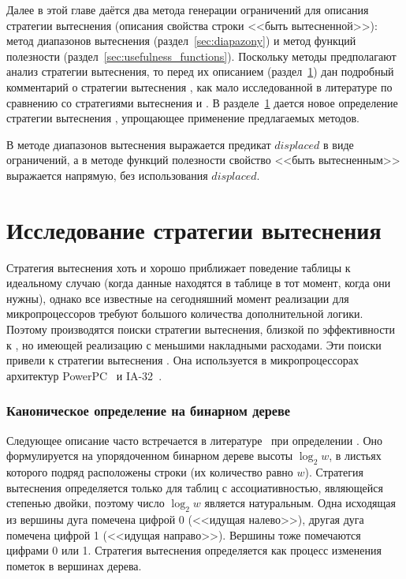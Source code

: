 Далее в этой главе даётся два метода генерации ограничений для описания
стратегии вытеснения (описания свойства строки <<быть вытесненной>>): метод диапазонов вытеснения (раздел~\ref{sec:diapazony}) и метод функций полезности (раздел~\ref{sec:usefulness_functions}). Поскольку методы предполагают анализ стратегии вытеснения, то
перед их описанием (раздел~\ref{sec:plru_new_definition}) дан подробный
комментарий о стратегии вытеснения \PseudoLRU, как мало исследованной в
литературе по сравнению со стратегиями вытеснения \LRU и \FIFO. В
разделе~\ref{sec:plru_new_definition} дается новое определение стратегии вытеснения \PseudoLRU, упрощающее применение предлагаемых методов.

В методе диапазонов вытеснения выражается предикат $displaced$ в виде ограничений, а в методе функций полезности свойство <<быть вытесненным>> выражается напрямую, без использования $displaced$.

\section{Исследование стратегии вытеснения \PseudoLRU}\label{sec:plru_new_definition}

Стратегия вытеснения \LRU хоть и хорошо приближает поведение
таблицы к идеальному случаю (когда данные находятся в
таблице в тот момент, когда они нужны), однако все известные на
сегодняшний момент реализации \LRU для микропроцессоров требуют большого
количества дополнительной логики. Поэтому производятся поиски
стратегии вытеснения, близкой по эффективности к \LRU, но имеющей
реализацию с меньшими накладными расходами. Эти поиски привели к
стратегии вытеснения \PseudoLRU. Она используется в микропроцессорах архитектур
PowerPC~\cite{PowerPC} и IA-32~\cite{FundamentalOfComputerOrganizationAndDesign}.

\subsubsection{Каноническое определение \PseudoLRU на бинарном дереве}

Следующее описание часто встречается в
литературе~\cite{FundamentalOfComputerOrganizationAndDesign} при
определении \PseudoLRU. Оно формулируется на
упорядоченном бинарном дереве высоты $\log_2 w$, в листьях которого
подряд расположены строки (их количество равно $w$). Стратегия вытеснения
\PseudoLRU
определяется только для таблиц с ассоциативностью, являющейся степенью двойки,
поэтому число $\log_2 w$ является натуральным. Одна исходящая из вершины дуга
помечена цифрой 0 (<<идущая налево>>), другая дуга помечена цифрой 1 (<<идущая
направо>>). Вершины тоже помечаются цифрами 0 или 1. Стратегия вытеснения
определяется как процесс изменения пометок в вершинах дерева.

